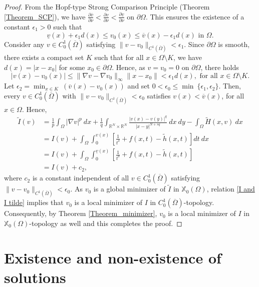 \documentclass[reqno,oneside]{amsart}
\theoremstyle{definition}
\theoremstyle{remark}
\numberwithin{equation}{section}
\newcommand{\Om} {\Omega}
\newcommand{\sr}{\mathbb{R}}
\newcommand{\pa}{\partial}
\newcommand{\na} {\nabla}
\newcommand{\omc}{(\overline{\Om})}
\newcommand{\xo}{\mathbb{X}_0}
\begin{document}
\begin{proof}
    From the Hopf-type Strong Comparison Principle (Theorem \ref{Theorem_SCP}), we have $\frac{\pa \overline{v}}{\pa \nu} <\frac{\pa v}{\pa \nu}<\frac{\pa \underline{v}}{\pa \nu}$ on $\pa  \Omega.$ This ensures the existence of a constant $\epsilon_1 >0$ such that
    \[\underline{v} (x) + \epsilon_1 d(x) \leq v_0 (x) \leq \overline{v} (x) - \epsilon_1 d(x) \text{ in } \Om.\]
    Consider any $v\in C^1_0 \omc$ satisfying $\| v- v_0 \|_{C^1 \omc} < \epsilon_1$. Since $\partial\Omega$ is smooth, there exists a compact set $K$ such that for all $x\in \Omega\setminus K$, we have $d(x)=|x-x_0|$ for some $x_0\in \partial \Omega.$ Hence, as $v=v_0 =0$ on $\pa\Om$, there holds
    $$|v(x)-v_0(x)|\leq \|\nabla v-\nabla v_0\|_{\infty} \|x-x_0\|<\epsilon_1 d(x), \text{ for all } x\in \Om \setminus K.$$
    Let $\displaystyle \epsilon_2= \min_{x\in K}\ \left(\overline{v}(x)-v_0(x) \right)$ and set $0< \epsilon_0 \leq \min\ \{\epsilon_1, \epsilon_2\}$. Then, every $v\in C^1_0 \omc$ with $\|v-v_0\|_{C^{1}\omc}<\epsilon_0$ satisfies $v(x)<\overline{v}(x)$, for all $x\in \Omega$. Hence, 
    \begin{align}\label{I and I tilde}
        \tilde{I}(v) &= \frac{1}{p} \int_{\Om} |\na v|^p\ dx + \frac{1}{q} \int_{\sr^N \times \sr^N} \frac{|v(x) - v(y)|^q}{|x-y|^{N+sq}}\ dx\ dy - \int_{\Om} \tilde{H}(x,v)\ dx\nonumber\\
        &= I(v) + \int_{\Om} \int_0^{v(x)} \left[ \frac{1}{t^{\delta}} + f(x,t) - \tilde{h}(x,t) \right] dt\ dx\nonumber\\
        &= I(v) + \int_{\Om} \int_0^{\underline{v} (x)} \left[ \frac{1}{t^{\delta}} + f(x,t) - \tilde{h}(x,t) \right]\nonumber\\
        &= I(v) + c_2,
    \end{align}
    where $c_2$ is a constant independent of all $v\in C^1_0 \omc$ satisfying $\| v- v_0 \|_{C^1 \omc} < \epsilon_0$. As $v_0$ is a global minimizer of $\tilde{I}$ in $\xo (\Om)$, relation \eqref{I and I tilde} implies that $v_0$ is a local minimizer of $I$ in $C^1_0 \omc$-topology. Consequently, by Theorem \ref{Theorem_minimizer}, $v_0$ is a local minimizer of $I$ in $\xo (\Om)$-topology as well and this completes the proof.
\end{proof}


\section{Existence and non-existence of solutions}\label{section_first_solution}
\end{document}

